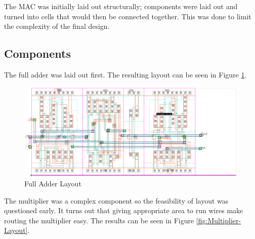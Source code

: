 \documentclass[11pt]{article}
\begin{document}
	The MAC was initially laid out structurally; components were laid out and turned into cells that would then be connected together. This was done to limit the complexity of the final design. 
	
	
	\subsection{Components}
	
		The full adder was laid out first. The resulting layout can be seen in Figure \ref{fig:Full-Adder-Layout}.
		
		\begin{figure}[H] 
			\centering 
			\includegraphics[width=\textwidth,height=\dimexpr\textheight-4\baselineskip-\abovecaptionskip-\belowcaptionskip\relax,keepaspectratio]{"Pictures/Full Adder Layout"}
			\caption{Full Adder Layout} 
			\label{fig:Full-Adder-Layout} 
		\end{figure}
	
		The multiplier was a complex component so the feasibility of layout was questioned early. It turns out that giving appropriate area to run wires make routing the multiplier easy. The results can be seen in Figure \ref{fig:Multiplier-Layout}.
	
\end{document}

